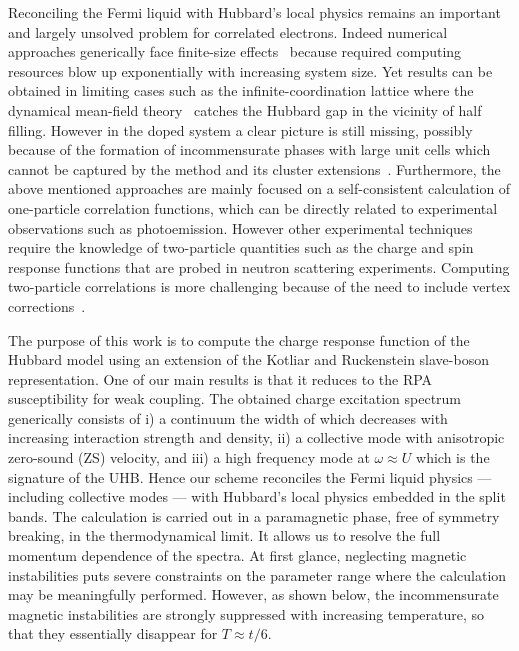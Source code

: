 \documentclass[showpacs,amsmath,twocolumn,floatfix]{revtex4-1}
\begin{document}
Reconciling the Fermi liquid with Hubbard's local physics remains an important 
and largely unsolved problem for correlated electrons. Indeed numerical approaches 
generically face finite-size effects~\cite{Bor91} because required computing 
resources blow up exponentially with increasing system size. 
Yet results can be obtained in limiting cases such as the infinite-coordination 
lattice where the dynamical mean-field theory~\cite{Geo96,Bul01} catches the Hubbard gap 
in the vicinity of half filling. However in the doped system a clear picture is still 
missing, possibly because of the formation of incommensurate phases with large unit cells 
which cannot be captured by the method and its cluster extensions~\cite{Shr90,Fre91,
SeiSi,Sei02,Rac06,Cha10,stripes,Cor14,Lep15}. Furthermore, the above mentioned 
approaches are mainly focused on a self-consistent calculation of one-particle 
correlation functions, which can be directly related to experimental observations 
such as photoemission. However other experimental techniques require the 
knowledge of two-particle quantities such as the charge and spin response 
functions that are probed in neutron scattering experiments. Computing 
two-particle correlations is more challenging because of the need to include 
vertex corrections~\cite{Geo96,Haf14}.   

The purpose of this work is to compute the charge response function of the 
Hubbard model using an extension of the Kotliar and Ruckenstein slave-boson 
representation. One of our main results is that it reduces to the RPA 
susceptibility for weak coupling. 
The obtained charge excitation spectrum generically consists of i) a continuum 
the width of which decreases with increasing interaction strength and density, 
ii) a collective mode with anisotropic zero-sound (ZS) velocity, and iii) a high
frequency mode at $\omega \approx U$ which is the signature of the UHB. Hence 
our scheme reconciles the Fermi liquid physics --- including collective modes 
--- with Hubbard's local physics embedded in the split bands. The calculation 
is carried out in a paramagnetic phase, free of symmetry breaking, in the 
thermodynamical limit. It allows us to resolve the full momentum dependence of the 
spectra. At first glance, neglecting magnetic instabilities puts severe constraints 
on the parameter range where the calculation may be meaningfully performed. However, 
as shown below, the incommensurate magnetic instabilities are strongly suppressed 
with increasing temperature, so that they essentially disappear for $T\approx t/6$.  
\end{document}
